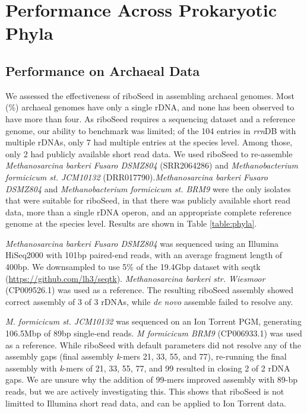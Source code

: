 \section*{Performance Across Prokaryotic Phyla}
\subsection*{Performance on Archaeal Data}

We assessed the effectiveness of riboSeed in assembling archaeal genomes. Most (\%) archaeal genomes have only a single rDNA, and none has been observed to have more than four. As riboSeed requires a sequencing dataset and a reference genome, our ability to benchmark was limited; of the 104 entries in \textit{rrn}DB with multiple rDNAs, only 7 had multiple entries at the species level. Among those, only 2 had publicly available short read data. We used riboSeed to re-assemble \textit{Methanosarcina barkeri Fusaro DSMZ804} (SRR2064286) and \textit{Methanobacterium formicicum st. JCM10132} (DRR017790).\textit{Methanosarcina barkeri Fusaro DSMZ804} and  \textit{Methanobacterium formicicum st. BRM9}  were the only isolates that were suitable for riboSeed, in that there was publicly available short read data, more than a single rDNA operon, and an appropriate complete reference genome at the species level.  Results are shown in Table \ref{table:phyla}.

\textit{Methanosarcina barkeri Fusaro DSMZ804} was sequenced using an Illumina HiSeq2000 with 101bp paired-end reads, with an average fragment length of 400bp. We downsampled to use 5\% of the 19.4Gbp dataset with seqtk (\href{https://github.com/lh3/seqtk}{https://github.com/lh3/seqtk}). \textit{Methanosarcina barkeri str. Wiesmoor} (CP009526.1) was used as a reference. The resulting riboSeed assembly showed correct assembly of 3 of 3 rDNAs, while \textit{de novo} assemble failed to resolve any.

\textit{M. formicicum st. JCM10132} was sequenced on an Ion Torrent PGM, generating 106.5Mbp of 89bp single-end reads. \textit{M formicicum BRM9} (CP006933.1) was used as a reference. While riboSeed with default parameters did not resolve any of the assembly gaps (final assembly \textit{k}-mers 21, 33, 55, and 77), re-running the final assembly with \textit{k}-mers of 21, 33, 55, 77, and 99 resulted in closing 2 of 2 rDNA gaps. We are unsure why the addition of 99-mers improved assembly with 89-bp reads, but we are actively investigating this. This shows that riboSeed is not limitted to Illumina short read data, and can be applied to Ion Torrent data.

